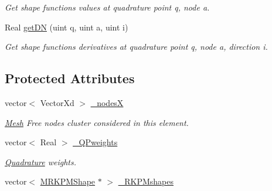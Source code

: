 \begin{DoxyCompactItemize}
\begin{DoxyCompactList}\small\item\em Get shape functions values at quadrature point q, node a. \item\end{DoxyCompactList}\item 
\hypertarget{classvoom_1_1_r_k_p_mgeom_element_a6a63641a09d891392bd7df1bb60ce777}{
Real \hyperlink{classvoom_1_1_r_k_p_mgeom_element_a6a63641a09d891392bd7df1bb60ce777}{getDN} (uint q, uint a, uint i)}
\label{classvoom_1_1_r_k_p_mgeom_element_a6a63641a09d891392bd7df1bb60ce777}

\begin{DoxyCompactList}\small\item\em Get shape functions derivatives at quadrature point q, node a, direction i. \item\end{DoxyCompactList}\end{DoxyCompactItemize}
\subsection*{Protected Attributes}
\begin{DoxyCompactItemize}
\item 
\hypertarget{classvoom_1_1_r_k_p_mgeom_element_abe43535c61ee4439631a40fc7cd2da08}{
vector$<$ VectorXd $>$ \hyperlink{classvoom_1_1_r_k_p_mgeom_element_abe43535c61ee4439631a40fc7cd2da08}{\_\-nodesX}}
\label{classvoom_1_1_r_k_p_mgeom_element_abe43535c61ee4439631a40fc7cd2da08}

\begin{DoxyCompactList}\small\item\em \hyperlink{classvoom_1_1_mesh}{Mesh} Free nodes cluster considered in this element. \item\end{DoxyCompactList}\item 
\hypertarget{classvoom_1_1_r_k_p_mgeom_element_a63e8ed05887db7e75665ec09b48456c5}{
vector$<$ Real $>$ \hyperlink{classvoom_1_1_r_k_p_mgeom_element_a63e8ed05887db7e75665ec09b48456c5}{\_\-QPweights}}
\label{classvoom_1_1_r_k_p_mgeom_element_a63e8ed05887db7e75665ec09b48456c5}

\begin{DoxyCompactList}\small\item\em \hyperlink{classvoom_1_1_quadrature}{Quadrature} weights. \item\end{DoxyCompactList}\item 
vector$<$ \hyperlink{classvoom_1_1_m_r_k_p_m_shape}{MRKPMShape} $\ast$ $>$ \hyperlink{classvoom_1_1_r_k_p_mgeom_element_a523f9b8a58ef870105d7afc70243d40d}{\_\-RKPMshapes}
\end{DoxyCompactItemize}


